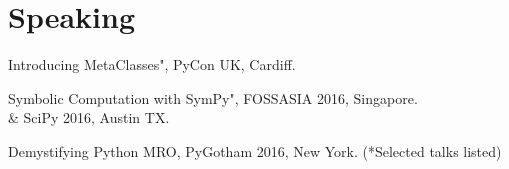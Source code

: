\documentclass[]{deedy-resume-openfont}
\begin{document}
\begin{minipage}[t]{0.66\textwidth}
\sectionsep


\section{Speaking}
\begin{tightemize}
\item Introducing MetaClasses", PyCon UK, Cardiff.
\item Symbolic Computation with SymPy", FOSSASIA 2016, Singapore.\\ \& SciPy 2016, Austin TX.
\item Demystifying Python MRO, PyGotham 2016, New York. (*Selected talks listed)
\end{tightemize}


% 
% 




\end{minipage} 
\end{document}

